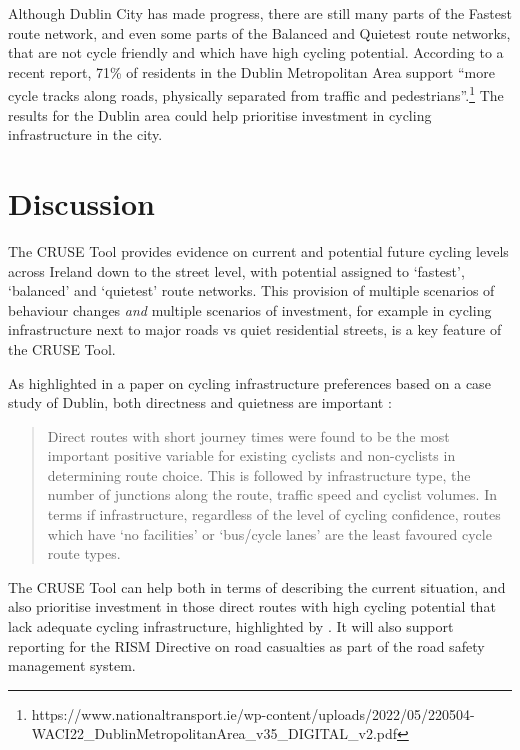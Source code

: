 \documentclass[
  super,
  preprint,
  3p]{elsarticle}
\begin{document}
Although Dublin City has made progress, there are still many parts of
the Fastest route network, and even some parts of the Balanced and
Quietest route networks, that are not cycle friendly and which have high
cycling potential. According to a recent report, 71\% of residents in
the Dublin Metropolitan Area support ``more cycle tracks along roads,
physically separated from traffic and pedestrians''.\footnote{https://www.nationaltransport.ie/wp-content/uploads/2022/05/220504-WACI22\_DublinMetropolitanArea\_v35\_DIGITAL\_v2.pdf}
The results for the Dublin area could help prioritise investment in
cycling infrastructure in the city.

\hypertarget{sec-discussion}{%
\section{Discussion}\label{sec-discussion}}

The CRUSE Tool provides evidence on current and potential future cycling
levels across Ireland down to the street level, with potential assigned
to `fastest', `balanced' and `quietest' route networks. This provision
of multiple scenarios of behaviour changes \emph{and} multiple scenarios
of investment, for example in cycling infrastructure next to major roads
vs quiet residential streets, is a key feature of the CRUSE Tool.

As highlighted in a paper on cycling infrastructure preferences based on
a case study of Dublin, both directness and quietness are important
\citep{caulfield2012}:

\begin{quote}
Direct routes with short journey times were found to be the most
important positive variable for existing cyclists and non-cyclists in
determining route choice. This is followed by infrastructure type, the
number of junctions along the route, traffic speed and cyclist volumes.
In terms if infrastructure, regardless of the level of cycling
confidence, routes which have `no facilities' or `bus/cycle lanes' are
the least favoured cycle route types.
\end{quote}

The CRUSE Tool can help both in terms of describing the current
situation, and also prioritise investment in those direct routes with
high cycling potential that lack adequate cycling infrastructure,
highlighted by \citet{caulfield2012}. It will also support reporting for
the RISM Directive on road casualties as part of the road safety
management system.
\end{document}
